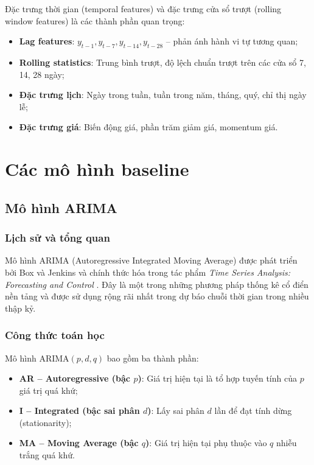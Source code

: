 Đặc trưng thời gian (temporal features) và đặc trưng cửa sổ trượt (rolling window features) là các thành phần quan trọng:
\begin{itemize}
    \item \textbf{Lag features}: $y_{t-1}, y_{t-7}, y_{t-14}, y_{t-28}$ -- phản ánh hành vi tự tương quan;
    \item \textbf{Rolling statistics}: Trung bình trượt, độ lệch chuẩn trượt trên các cửa sổ 7, 14, 28 ngày;
    \item \textbf{Đặc trưng lịch}: Ngày trong tuần, tuần trong năm, tháng, quý, chỉ thị ngày lễ;
    \item \textbf{Đặc trưng giá}: Biến động giá, phần trăm giảm giá, momentum giá.
\end{itemize}

\section{Các mô hình baseline}
\label{sec:mo_hinh_baseline}

\subsection{Mô hình ARIMA}
\label{subsec:arima}

\subsubsection{Lịch sử và tổng quan}

Mô hình ARIMA (Autoregressive Integrated Moving Average) được phát triển bởi Box và Jenkins và chính thức hóa trong tác phẩm \textit{Time Series Analysis: Forecasting and Control} \citep{box1970time}. Đây là một trong những phương pháp thống kê cổ điển nền tảng và được sử dụng rộng rãi nhất trong dự báo chuỗi thời gian trong nhiều thập kỷ.

\subsubsection{Công thức toán học}

Mô hình ARIMA$(p, d, q)$ bao gồm ba thành phần:

\begin{itemize}
    \item \textbf{AR -- Autoregressive (bậc $p$)}: Giá trị hiện tại là tổ hợp tuyến tính của $p$ giá trị quá khứ;
    \item \textbf{I -- Integrated (bậc sai phân $d$)}: Lấy sai phân $d$ lần để đạt tính dừng (stationarity);
    \item \textbf{MA -- Moving Average (bậc $q$)}: Giá trị hiện tại phụ thuộc vào $q$ nhiễu trắng quá khứ.
\end{itemize}

